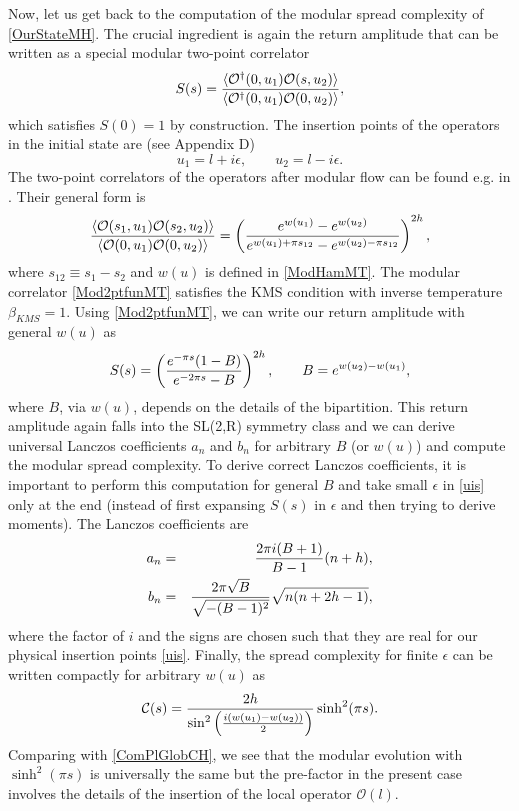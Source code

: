 \documentclass[aps,prl,twocolumn,showpacs,preprintnumbers,amsmath,amssymb]{revtex4-1}
\def\frac#1#2{{#1\over #2}}
\def\be{\begin{equation}}
\def\ee{\end{equation}}
\newcommand{\bea}{\begin{eqnarray}}
\newcommand{\eea}{\end{eqnarray}}
\begin{document}
Now, let us get back to the computation of the modular spread complexity of \eqref{OurStateMH}. The crucial ingredient is again the return amplitude that can be written as a special modular  two-point correlator
\be
S(s)=\frac{\langle\mathcal{O}^\dagger(0,u_1)\mathcal{O}(s,u_2)\rangle}{\langle\mathcal{O}^\dagger(0,u_1)\mathcal{O}(0,u_2)\rangle},
\ee
which satisfies $S(0)=1$ by construction. The insertion points of the operators in the initial state are (see Appendix D)
 \be
 u_1=l+i\epsilon,\qquad u_2=l-i\epsilon. \label{uis}
 \ee
 The two-point correlators of the operators after modular flow can be found e.g. in \cite{Hislop:1981uh,Casini:2009vk,Longo:2009mn,Hollands:2019hje}. Their general form is
\be
\frac{\langle\mathcal{O}(s_1,u_1)\mathcal{O}(s_2,u_2)\rangle}{\langle\mathcal{O}(0,u_1)\mathcal{O}(0,u_2)\rangle}=\left(\frac{e^{w(u_1)}-e^{w(u_2)}}{e^{w(u_1)+\pi s_{12}}-e^{w(u_2)-\pi s_{12}}}\right)^{2h},\label{Mod2ptfunMT}
\ee
where $s_{12} \equiv s_1-s_2$ and $w(u)$ is defined in \eqref{ModHamMT}. The modular correlator \eqref{Mod2ptfunMT} satisfies the KMS condition with inverse temperature $\beta_{KMS}=1$.  Using \eqref{Mod2ptfunMT}, we can write our return amplitude with general $w(u)$ as
\be
S(s)=\left(\frac{e^{-\pi s}(1-B)}{e^{-2\pi s}-B}\right)^{2h},\qquad B=e^{w(u_2)-w(u_1)},\label{RetAmplUnivMT}
\ee
where $B$, via $w(u)$, depends on the details of the bipartition. This return amplitude again falls into the SL(2,R) symmetry class and we can derive universal Lanczos coefficients $a_n$ and $b_n$ for arbitrary $B$ (or $w(u)$) and compute the modular spread complexity. To derive correct Lanczos coefficients, it is important to perform this computation for general $B$ and take small $\epsilon$ in \eqref{uis} only at the end (instead of first expansing $S(s)$ in $\epsilon$ and then trying to derive moments). The Lanczos coefficients are 
\bea
a_n&=&\frac{2\pi i (B+1)}{B-1}(n+h),\nonumber\\
b_n&=&\frac{2\pi\sqrt{B}}{\sqrt{-(B-1)^2}}\sqrt{n(n+2h-1)},
\eea
where the factor of $i$ and the signs are chosen such that they are real for our physical insertion points \eqref{uis}. Finally, the spread complexity for finite $\epsilon$ can be written compactly for arbitrary $w(u)$ as
\be
\mathcal{C}(s)=\frac{2h}{\sin^2\left(\frac{i(w(u_1)-w(u_2))}{2}\right)}\sinh^2(\pi s).
\ee
Comparing with \eqref{ComPlGlobCH}, we see that the modular evolution with $\sinh^2(\pi s)$ is universally the same but the pre-factor in the present case involves the details of the insertion of the local operator $\mathcal{O}(l)$.\\
\end{document}
